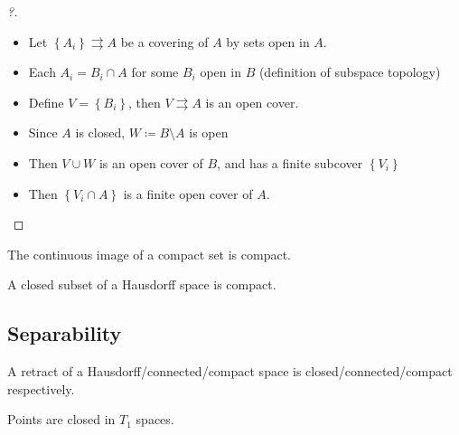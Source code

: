 \begin{proof}[?]

\envlist

\begin{itemize}
\tightlist
\item
  Let \(\left\{{A_i}\right\} \rightrightarrows A\) be a covering of
  \(A\) by sets open in \(A\).
\item
  Each \(A_i = B_i \cap A\) for some \(B_i\) open in \(B\) (definition
  of subspace topology)
\item
  Define \(V = \left\{{B_i}\right\}\), then \(V \rightrightarrows A\) is
  an open cover.
\item
  Since \(A\) is closed, \(W\coloneqq B\setminus A\) is open
\item
  Then \(V\cup W\) is an open cover of \(B\), and has a finite subcover
  \(\left\{{V_i}\right\}\)
\item
  Then \(\left\{{V_i \cap A}\right\}\) is a finite open cover of \(A\).
\end{itemize}

\end{proof}

\begin{theorem}

The continuous image of a compact set is compact.

\end{theorem}

\begin{theorem}

A closed subset of a Hausdorff space is compact.

\end{theorem}

\hypertarget{separability}{%
\subsection{Separability}\label{separability}}

\begin{proposition}

A retract of a Hausdorff/connected/compact space is
closed/connected/compact respectively.

\end{proposition}

\begin{proposition}[?]

Points are closed in \(T_1\) spaces.

\end{proposition}

